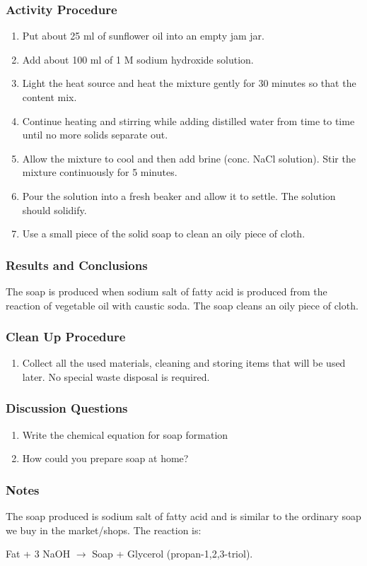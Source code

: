 \subsubsection*{Activity Procedure}
\begin{enumerate}
\item{Put about 25 ml of sunflower oil into an empty jam jar.}
\item{Add about 100 ml of 1 M sodium hydroxide solution.}
\item{Light the heat source and heat the mixture gently for 30 minutes so that the content mix.}
\item{Continue heating and stirring while adding distilled water from time to time until no more solids separate out.}
\item{Allow the mixture to cool and then add brine (conc. NaCl solution). Stir the mixture continuously for 5 minutes.}
\item{Pour the solution into a fresh beaker and allow it to settle. The solution should solidify.}
\item{Use a small piece of the solid soap to clean an oily piece of cloth.}
\end{enumerate}

\subsubsection*{Results and Conclusions}
The soap is produced when sodium salt of fatty acid is produced from the reaction of vegetable oil with caustic soda. The soap cleans an oily piece of cloth.

\subsubsection*{Clean Up Procedure}
\begin{enumerate}
\item{Collect all the used materials, cleaning and storing items that will be used later. No special waste disposal is required.}
\end{enumerate}

\subsubsection*{Discussion Questions}
\begin{enumerate}
\item{Write the chemical equation for soap formation}
\item{How could you prepare soap at home?}
\end{enumerate}

\subsubsection*{Notes}
The soap produced is sodium salt of fatty acid and is similar to the ordinary soap we buy in the market/shops.
The reaction is:

Fat  +  3 NaOH  $\longrightarrow$ Soap  +  Glycerol (propan-1,2,3-triol).

